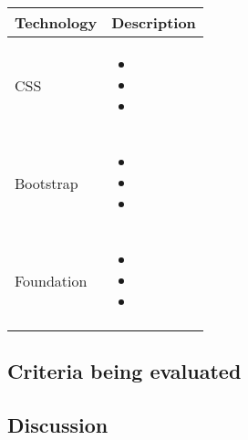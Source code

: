 \begin{center}
    \begin{tabular}{ | l | p{10cm} |}
    \hline
    Technology & Description  \\ \hline
    CSS&
    \begin{itemize}
      \item 
      \item 
      \item 
    \end{itemize}\\ \hline
    Bootstrap&
    \begin{itemize}
      \item 
      \item 
      \item 
    \end{itemize}\\ \hline
    Foundation&
    \begin{itemize}
      \item 
      \item 
      \item 
    \end{itemize}\\ \hline
    \end{tabular}
\end{center}

\subsection{Criteria being evaluated}


\subsection{Discussion}

